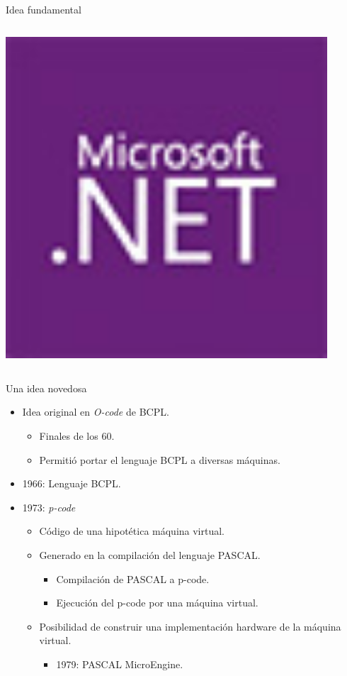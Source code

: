 \begin{frame}[t]{Idea fundamental}
\begin{columns}
\begin{column}{0.1\textwidth}
    \includegraphics[width=0.9\textwidth]{images/dotnet.jpg}
  \end{column}
\end{columns}
\end{frame}

\begin{frame}[t]{Una idea novedosa}
  \begin{itemize}
    \item Idea original en \emph{O-code} de BCPL.
      \begin{itemize}
        \item Finales de los 60.
        \item Permitió portar el lenguaje BCPL a diversas máquinas.
      \end{itemize}
    \item 1966: Lenguaje BCPL.
    \item 1973: \emph{p-code}
      \begin{itemize}
         \item Código de una hipotética máquina virtual.
         \item Generado en la compilación del lenguaje PASCAL.
           \begin{itemize}
             \item Compilación de PASCAL a p-code.
             \item Ejecución del p-code por una máquina virtual.
           \end{itemize}
         \item Posibilidad de construir una implementación hardware de la máquina virtual.
           \begin{itemize}
             \item 1979: PASCAL MicroEngine.
           \end{itemize}
      \end{itemize}
  \end{itemize}
\end{frame}

